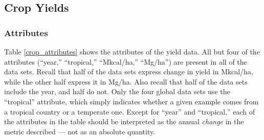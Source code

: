 \documentclass[11pt]{article}
\begin{document}
\clearpage
\subsection{Crop Yields}
\subsubsection{Attributes}
Table \ref{crop_attributes} shows the attributes of the yield data. All but four of the attributes (``year,'' ``tropical,'' ``Mkcal/ha,'' ``Mg/ha'') are present in all of the data sets. Recall that half of the data sets express change in yield in Mkcal/ha, while the other half express it in Mg/ha. Also recall that half of the data sets include the year, and half do not. Only the four global data sets use the ``tropical'' attribute, which simply indicates whether a given example comes from a tropical country or a temperate one. Except for ``year'' and ``tropical,'' each of the attributes in the table should be interpreted as the annual \emph{change} in the metric described --- not as an absolute quantity. 
\end{document}
